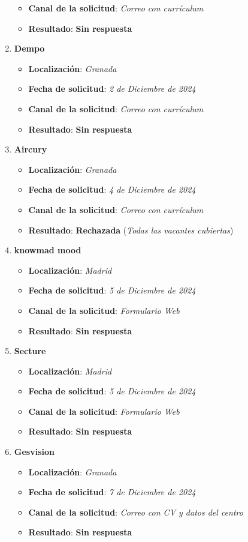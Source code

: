 \begin{enumerate}
\begin{itemize}
		\item \textbf{Canal de la solicitud}: \textit{Correo con currículum}
		\item \textbf{Resultado}: {\color{orange} \textbf{Sin respuesta}}
	\end{itemize}
	\item \textbf{Dempo}
	\begin{itemize}
		\item \textbf{Localización}: \textit{Granada}
		\item \textbf{Fecha de solicitud}: \textit{2 de Diciembre de 2024}
		\item \textbf{Canal de la solicitud}: \textit{Correo con currículum}
		\item \textbf{Resultado}: {\color{orange} \textbf{Sin respuesta}}
	\end{itemize}
		\item \textbf{Aircury}
	\begin{itemize}
		\item \textbf{Localización}: \textit{Granada}
		\item \textbf{Fecha de solicitud}: \textit{4 de Diciembre de 2024}
		\item \textbf{Canal de la solicitud}: \textit{Correo con currículum}
		\item \textbf{Resultado}: {\color{red}\textbf{Rechazada}} (\textit{Todas las vacantes cubiertas})
	\end{itemize}
	\item \textbf{knowmad mood}
	\begin{itemize}
		\item \textbf{Localización}: \textit{Madrid}
		\item \textbf{Fecha de solicitud}: \textit{5 de Diciembre de 2024}
		\item \textbf{Canal de la solicitud}: \textit{Formulario Web}
		\item \textbf{Resultado}: {\color{orange} \textbf{Sin respuesta}}
	\end{itemize}
	\item \textbf{Secture}
	\begin{itemize}
		\item \textbf{Localización}: \textit{Madrid}
		\item \textbf{Fecha de solicitud}: \textit{5 de Diciembre de 2024}
		\item \textbf{Canal de la solicitud}: \textit{Formulario Web}
		\item \textbf{Resultado}: {\color{orange} \textbf{Sin respuesta}}
	\end{itemize}
 	\item \textbf{Gesvision}
	\begin{itemize}
		\item \textbf{Localización}: \textit{Granada}
		\item \textbf{Fecha de solicitud}: \textit{7 de Diciembre de 2024}
		\item \textbf{Canal de la solicitud}: \textit{Correo con CV y datos del centro}
		\item \textbf{Resultado}: {\color{orange} \textbf{Sin respuesta}}
	\end{itemize}
\end{enumerate}







%


